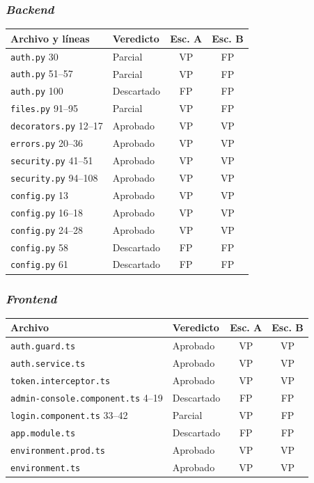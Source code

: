 \documentclass[11pt,letterpaper]{article}
\newcommand{\f}[1]{\texttt{#1}}
\newcommand{\enc}[1]{\textbf{#1}}
\begin{document}
\subsubsection*{\textit{Backend}}
\begin{center}
\begin{tabular}{p{4.2cm}p{2.8cm}cc}
\toprule
\enc{Archivo y líneas} & \enc{Veredicto} & \enc{Esc. A} & \enc{Esc. B} \\
\midrule
\f{auth.py} 30 & Parcial & VP & FP \\
\f{auth.py} 51--57 & Parcial & VP & FP \\
\f{auth.py} 100 & Descartado & FP & FP \\
\f{files.py} 91--95 & Parcial & VP & FP \\
\f{decorators.py} 12--17 & Aprobado & VP & VP \\
\f{errors.py} 20--36 & Aprobado & VP & VP \\
\f{security.py} 41--51 & Aprobado & VP & VP \\
\f{security.py} 94--108 & Aprobado & VP & VP \\
\f{config.py} 13 & Aprobado & VP & VP \\
\f{config.py} 16--18 & Aprobado & VP & VP \\
\f{config.py} 24--28 & Aprobado & VP & VP \\
\f{config.py} 58 & Descartado & FP & FP \\
\f{config.py} 61 & Descartado & FP & FP \\
\bottomrule
\end{tabular}
\end{center}

\subsubsection*{\textit{Frontend}}
\begin{center}
\begin{tabular}{p{5.2cm}p{2.8cm}cc}
\toprule
\enc{Archivo} & \enc{Veredicto} & \enc{Esc. A} & \enc{Esc. B} \\
\midrule
\f{auth.guard.ts} & Aprobado & VP & VP \\
\f{auth.service.ts} & Aprobado & VP & VP \\
\f{token.interceptor.ts} & Aprobado & VP & VP \\
\f{admin-console.component.ts} 4--19 & Descartado & FP & FP \\
\f{login.component.ts} 33--42 & Parcial & VP & FP \\
\f{app.module.ts} & Descartado & FP & FP \\
\f{environment.prod.ts} & Aprobado & VP & VP \\
\f{environment.ts} & Aprobado & VP & VP \\
\bottomrule
\end{tabular}
\end{center}
\end{document}
